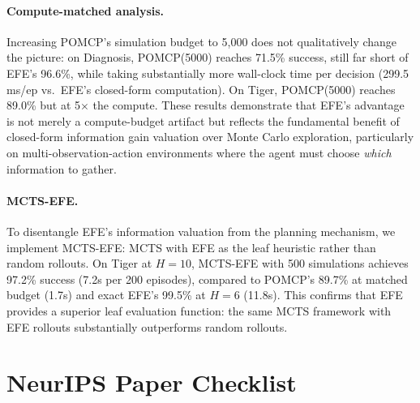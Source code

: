 \documentclass{article}
\begin{document}
\paragraph{Compute-matched analysis.} Increasing POMCP's simulation budget to 5{,}000 does not qualitatively change the picture: on Diagnosis, POMCP(5000) reaches 71.5\% success, still far short of EFE's 96.6\%, while taking substantially more wall-clock time per decision (299.5 ms/ep vs.\ EFE's closed-form computation). On Tiger, POMCP(5000) reaches 89.0\% but at 5$\times$ the compute. These results demonstrate that EFE's advantage is not merely a compute-budget artifact but reflects the fundamental benefit of closed-form information gain valuation over Monte Carlo exploration, particularly on multi-observation-action environments where the agent must choose \emph{which} information to gather.

\paragraph{MCTS-EFE.} To disentangle EFE's information valuation from the planning mechanism, we implement MCTS-EFE: MCTS with EFE as the leaf heuristic rather than random rollouts. On Tiger at $H{=}10$, MCTS-EFE with 500 simulations achieves 97.2\% success (7.2s per 200 episodes), compared to POMCP's 89.7\% at matched budget (1.7s) and exact EFE's 99.5\% at $H{=}6$ (11.8s). This confirms that EFE provides a superior leaf evaluation function: the same MCTS framework with EFE rollouts substantially outperforms random rollouts.


\section*{NeurIPS Paper Checklist}
\end{document}

